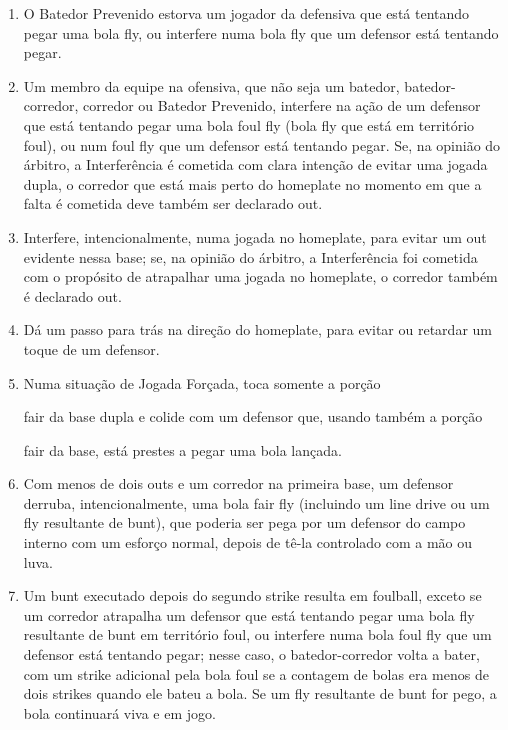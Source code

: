 \begin{multicols}{2}
\begin{enumerate}[label=\alph*)]
\begin{enumerate}[label=\roman*.]
			\item O Batedor Prevenido estorva um jogador da defensiva que est\'a tentando pegar uma bola \gls{fly}, ou interfere numa bola \gls{fly} que um defensor est\'a 
			tentando pegar. 
			
			\item Um membro da equipe na ofensiva, que n\~ao seja um batedor, batedor-
			corredor, corredor ou Batedor Prevenido, interfere na a\c{c}\~ao de um defensor que est\'a tentando pegar uma bola \gls{foul fly} (bola \gls{fly} que est\'a em territ\'orio \gls{foul}), ou num \gls{foul fly} que um defensor est\'a tentando pegar. 
			Se, na opini\~ao do \'arbitro, a Interfer\^encia \'e cometida com clara inten\c{c}\~ao de evitar uma jogada dupla, o corredor que est\'a mais perto do \gls{homeplate} no momento em que a falta \'e cometida deve tamb\'em ser declarado \gls{out}. 
			\item Interfere, intencionalmente, numa jogada no \gls{homeplate}, para evitar um \gls{out} evidente nessa base; se, na opini\~ao do \'arbitro, a Interfer\^encia foi cometida com o prop\'osito de atrapalhar uma jogada no \gls{homeplate}, o corredor tamb\'em \'e declarado \gls{out}. 
			\item D\'a um passo para tr\'as na dire\c{c}\~ao do \gls{homeplate}, para evitar ou retardar um toque de um defensor. 
			\item Numa situa\c{c}\~ao de Jogada For\c{c}ada, toca somente a por\c{c}\~ao 
			
			\gls{fair} da base dupla e colide com um defensor que, usando tamb\'em a por\c{c}\~ao
			
			\gls{fair} da base, est\'a prestes a pegar uma bola lan\c{c}ada. 

			\item Com menos de dois \glspl{out} e um corredor na primeira base, um defensor derruba, intencionalmente, uma bola \gls{fair fly} (incluindo um \gls{line drive} ou um \gls{fly} resultante de \gls{bunt}), que poderia ser pega por um defensor do campo interno com um esfor\c{c}o normal, depois de t\^e-la controlado com a m\~ao ou luva. 
			
			\item Um \gls{bunt} executado depois do segundo \gls{strike} resulta em \gls{foulball}, exceto se um corredor atrapalha um defensor que est\'a tentando pegar uma bola \gls{fly} resultante de \gls{bunt} em territ\'orio \gls{foul}, ou interfere numa bola \gls{foul fly} que um defensor est\'a tentando pegar; nesse caso, o batedor-corredor volta a bater, com um \gls{strike} adicional pela bola \gls{foul} se a contagem de bolas era menos de dois \glspl{strike} quando ele bateu a bola. Se um \gls{fly} resultante de \gls{bunt} for pego, a bola continuar\'a viva e em jogo. 
		\end{enumerate}
	

\end{enumerate}
\end{multicols}
